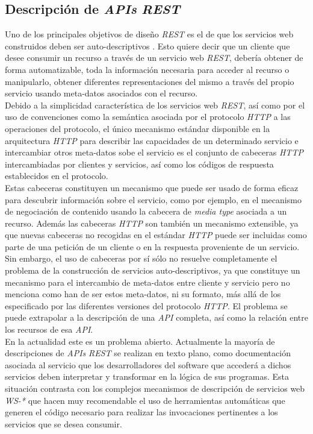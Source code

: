\subsection{Descripci\'on de \textit{APIs} \textit{REST}}

Uno de los principales objetivos de dise\~no \textit{REST} es el de que los servicios web construidos deben ser auto-descriptivos \cite{berners1997axioms}. Esto quiere decir que un cliente que desee consumir un recurso a trav\'es de un servicio web \textit{REST}, deber\'ia obtener de forma automatizable, toda la informaci\'on necesaria para acceder al recurso o manipularlo, obtener diferentes representaciones del mismo a trav\'es del propio servicio usando meta-datos asociados con el recurso.\\
Debido a la simplicidad caracter\'istica de los servicios web \textit{REST}, as\'i como por el uso de convenciones como la sem\'antica asociada por el protocolo \textit{HTTP} a las operaciones del protocolo, el  \'unico mecanismo est\'andar disponible en la arquitectura \textit{HTTP} para describir las capacidades de un determinado servicio e intercambiar otros meta-datos sobe el servicio es el conjunto de cabeceras \textit{HTTP} intercambiadas por clientes y servicios, as\'i como los c\'odigos de respuesta establecidos en el protocolo.\\
Estas cabeceras constituyen un mecanismo que puede ser usado de forma eficaz para descubrir informaci\'on sobre el servicio, como por ejemplo, en el mecanismo de negociaci\'on de contenido usando la cabecera de \textit{media type} asociada a un recurso. Adem\'as las cabeceras \textit{HTTP} son tambi\'en un mecanismo extensible, ya que nuevas cabeceras no recogidas en el est\'andar \textit{HTTP} puede ser incluidas como parte de una petici\'on de un cliente o en la respuesta proveniente de un servicio.\\
Sin embargo, el uso de cabeceras por s\'i s\'olo no resuelve completamente el problema de la construcci\'on de servicios auto-descriptivos, ya que constituye un mecanismo para el intercambio de meta-datos entre cliente y servicio pero no menciona como han de ser estos meta-datos, ni su formato, m\'as all\'a de los especificado por las diferentes versiones del protocolo \textit{HTTP}.
El problema se puede extrapolar a la descripci\'on de una \textit{API} completa, as\'i como la relaci\'on entre los recursos de esa \textit{API}.\\
En la actualidad este es un problema abierto. Actualmente la mayor\'ia de descripciones de \textit{APIs} \textit{REST} se realizan en texto plano, como documentaci\'on asociada al servicio que los desarrolladores del software que acceder\'a a dichos servicios deben interpretar y transformar en la l\'ogica de sus programas. Esta situaci\'on contrasta con los complejos mecanismos de descripci\'on de servicios web \textit{WS-*} que hacen muy recomendable el uso de herramientas autom\'aticas que generen el c\'odigo necesario para realizar las invocaciones pertinentes a los servicios que se desea consumir. \\
